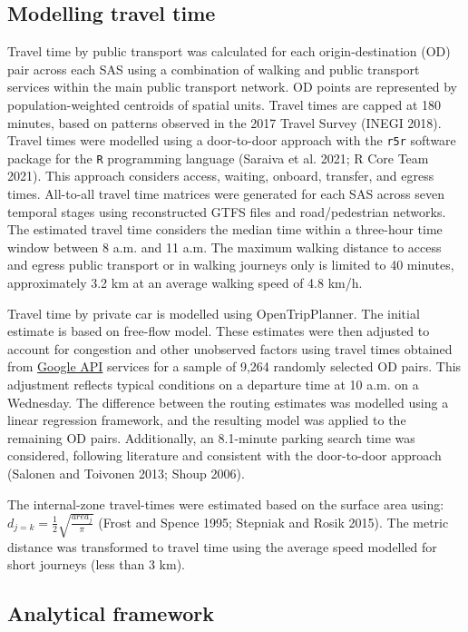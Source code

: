\documentclass{article}
\begin{document}
\subsection{Modelling travel time}\label{modelling-travel-time}

Travel time by public transport was calculated for each
origin-destination (OD) pair across each SAS using a combination of
walking and public transport services within the main public transport
network. OD points are represented by population-weighted centroids of
spatial units. Travel times are capped at 180 minutes, based on patterns
observed in the 2017 Travel Survey (INEGI 2018). Travel times were
modelled using a door-to-door approach with the \texttt{r5r} software
package for the \texttt{R} programming language (Saraiva et al. 2021; R
Core Team 2021). This approach considers access, waiting, onboard,
transfer, and egress times. All-to-all travel time matrices were
generated for each SAS across seven temporal stages using reconstructed
GTFS files and road/pedestrian networks. The estimated travel time
considers the median time within a three-hour time window between 8 a.m.
and 11 a.m. The maximum walking distance to access and egress public
transport or in walking journeys only is limited to 40 minutes,
approximately 3.2 km at an average walking speed of 4.8 km/h.

Travel time by private car is modelled using OpenTripPlanner. The
initial estimate is based on free-flow model. These estimates were then
adjusted to account for congestion and other unobserved factors using
travel times obtained from
\href{https://developers.google.com/apis-explorer}{Google API} services
for a sample of 9,264 randomly selected OD pairs. This adjustment
reflects typical conditions on a departure time at 10 a.m. on a
Wednesday. The difference between the routing estimates was modelled
using a linear regression framework, and the resulting model was applied
to the remaining OD pairs. Additionally, an 8.1-minute parking search
time was considered, following literature and consistent with the
door-to-door approach (Salonen and Toivonen 2013; Shoup 2006).

The internal-zone travel-times were estimated based on the surface area
using: \(d_{j=k} = \frac{1}{2} \sqrt{ \frac{area_j}{\pi}}\) (Frost and
Spence 1995; Stepniak and Rosik 2015). The metric distance was
transformed to travel time using the average speed modelled for short
journeys (less than 3 km).

\subsection{Analytical framework}\label{analytical-framework}
\end{document}
